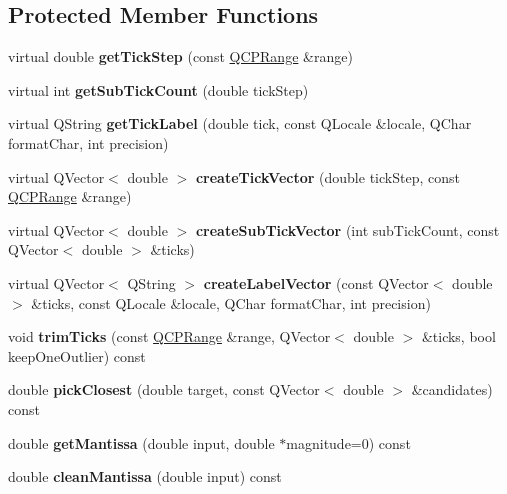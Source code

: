 \subsection*{Protected Member Functions}
\begin{DoxyCompactItemize}
\item 
\mbox{\label{classQCPAxisTicker_a910d69bcec2de37e92d8d4e1ecf201e2}} 
virtual double {\bfseries get\+Tick\+Step} (const \hyperlink{classQCPRange}{Q\+C\+P\+Range} \&range)
\item 
\mbox{\label{classQCPAxisTicker_a4ccc403ced7a1457ce6ba293509933c8}} 
virtual int {\bfseries get\+Sub\+Tick\+Count} (double tick\+Step)
\item 
\mbox{\label{classQCPAxisTicker_a8201eb4aa8be192bf786b126eb5ee089}} 
virtual Q\+String {\bfseries get\+Tick\+Label} (double tick, const Q\+Locale \&locale, Q\+Char format\+Char, int precision)
\item 
\mbox{\label{classQCPAxisTicker_af4645a824c7bd2ca8fc7e86ebf9055bd}} 
virtual Q\+Vector$<$ double $>$ {\bfseries create\+Tick\+Vector} (double tick\+Step, const \hyperlink{classQCPRange}{Q\+C\+P\+Range} \&range)
\item 
\mbox{\label{classQCPAxisTicker_a9a6435723fa0bd366d1ea4c2cff7c33f}} 
virtual Q\+Vector$<$ double $>$ {\bfseries create\+Sub\+Tick\+Vector} (int sub\+Tick\+Count, const Q\+Vector$<$ double $>$ \&ticks)
\item 
\mbox{\label{classQCPAxisTicker_a804050e408f37a0b9770c6654ebe6aa7}} 
virtual Q\+Vector$<$ Q\+String $>$ {\bfseries create\+Label\+Vector} (const Q\+Vector$<$ double $>$ \&ticks, const Q\+Locale \&locale, Q\+Char format\+Char, int precision)
\item 
\mbox{\label{classQCPAxisTicker_ab28cc1ab549489be7975f5ce7e717916}} 
void {\bfseries trim\+Ticks} (const \hyperlink{classQCPRange}{Q\+C\+P\+Range} \&range, Q\+Vector$<$ double $>$ \&ticks, bool keep\+One\+Outlier) const
\item 
\mbox{\label{classQCPAxisTicker_a4ea0a7c4ca1c610f92b9bd5944ab4260}} 
double {\bfseries pick\+Closest} (double target, const Q\+Vector$<$ double $>$ \&candidates) const
\item 
\mbox{\label{classQCPAxisTicker_a2f1e223bafbf2cec7c3ba8b08d5c77e8}} 
double {\bfseries get\+Mantissa} (double input, double $\ast$magnitude=0) const
\item 
\mbox{\label{classQCPAxisTicker_ac7df6c72876b7abd67c932663a0b0f6a}} 
double {\bfseries clean\+Mantissa} (double input) const
\end{DoxyCompactItemize}
